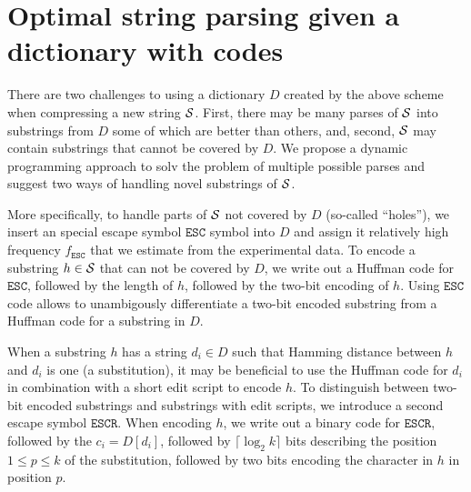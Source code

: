 \documentclass[12pt]{cmuthesis}
\begin{document}
\section{Optimal string parsing given a dictionary with codes}

  \newcommand{\esc}{\texttt{ESC}\xspace}
  \newcommand{\escremap}{\texttt{ESCR}\xspace}


  There are two challenges to using a dictionary $D$ created by the above scheme when compressing a new string $\mathcal{S}$. First, there may be many parses of $\mathcal{S}$ into substrings from $D$ some of which are better than others, and, second, $\mathcal{S}$ may contain substrings that cannot be covered by $D$. We propose a dynamic programming approach to solv the problem of multiple possible parses and suggest two ways of handling novel substrings of $\mathcal{S}$.

  More specifically, to handle parts of $\mathcal{S}$ not covered by $D$ (so-called ``holes''), we insert an special escape symbol $\esc$ symbol into $D$ and assign it relatively high frequency $f_{\esc}$ that we estimate from the experimental data. To encode a substring $h \in \mathcal{S}$ that can not be covered by $D$, we write out a Huffman code for $\esc$, followed by the length of $h$, followed by the two-bit encoding of $h$. Using $\esc$ code allows to unambigously differentiate a two-bit encoded substring from a Huffman code for a substring in $D$.

  When a substring $h$ has a string $d_i \in D$ such that Hamming distance between $h$ and $d_i$ is one (a substitution), it may be beneficial to use the Huffman code for $d_i$ in combination with a short edit script to encode $h$. To distinguish between two-bit encoded substrings and substrings with edit scripts, we introduce a second escape symbol $\escremap$. When encoding $h$, we write out a binary code for $\escremap$, followed by the $c_i = D[d_i]$, followed by $\lceil \log_2 k \rceil$ bits describing the position $1 \leq p \leq k$ of the substitution, followed by two bits encoding the character in $h$ in position $p$.

\end{document}
